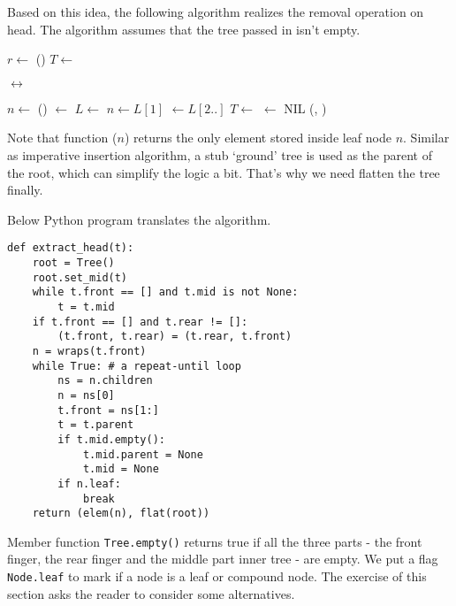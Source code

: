 \documentclass[UTF8]{article}
\begin{document}
Based on this idea, the following algorithm realizes the removal operation on head. The
algorithm assumes that the tree passed in isn't empty.

\begin{algorithmic}
  \State $r \gets$ ()
  \State {}
    \State $T \gets$ 
  \EndWhile

    \State {}  $\leftrightarrow$ 
  \EndIf

  \State $n \gets $ ()
  \State {} $\gets$ 
  \Repeat
    \State $L \gets$  
    \State $n \gets L[1]$ 
    \State {} $\gets L[2..]$ 
    \State $T \gets $ 
      \State {} $\gets$ NIL
    \EndIf
  \State \Return (, )
\EndFunction
\end{algorithmic}

Note that function ($n$) returns the only element stored inside leaf node $n$.
Similar as imperative insertion algorithm, a stub `ground' tree is used as the parent of
the root, which can simplify the logic a bit. That's why we need flatten the tree finally.

Below Python program translates the algorithm.

\lstset{language=Python}
\begin{lstlisting}
def extract_head(t):
    root = Tree()
    root.set_mid(t)
    while t.front == [] and t.mid is not None:
        t = t.mid
    if t.front == [] and t.rear != []:
        (t.front, t.rear) = (t.rear, t.front)
    n = wraps(t.front)
    while True: # a repeat-until loop
        ns = n.children
        n = ns[0]
        t.front = ns[1:]
        t = t.parent
        if t.mid.empty():
            t.mid.parent = None
            t.mid = None
        if n.leaf:
            break
    return (elem(n), flat(root))
\end{lstlisting}

Member function \verb|Tree.empty()| returns true if all the three parts - the front finger,
the rear finger and the middle part inner tree - are empty. We put a flag \verb|Node.leaf|
to mark if a node is a leaf or compound node. The exercise of this section asks the reader
to consider some alternatives.
\end{document}
